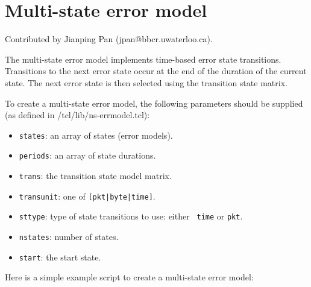 \section{Multi-state error model}

Contributed by Jianping Pan (jpan@bbcr.uwaterloo.ca).

The multi-state error model implements time-based error state
transitions. Transitions to the next  
error state occur at the end of the duration of the current state. The
next error state is then selected using the 
transition state matrix.

To create a multi-state error model, the following parameters should
be supplied (as defined in \ns/tcl/lib/ns-errmodel.tcl): 
\begin{itemize}
\item {\tt states}: an array of states (error models).
\item {\tt periods}: an array of state durations.
\item {\tt trans}: the transition state model matrix.
\item {\tt transunit}: one of {\tt [pkt|byte|time]}.
\item {\tt sttype}: type of state transitions to use: either {\tt
    time} or {\tt pkt}.
\item {\tt nstates}: number of states.
\item {\tt start}: the start state.
\end{itemize}

Here is a simple example script to create a multi-state error model:

